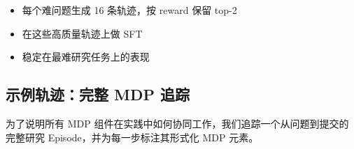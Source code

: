 \begin{enumerate}
\begin{itemize}
  \item 每个难问题生成 16 条轨迹，按 reward 保留 top-2
  \item 在这些高质量轨迹上做 SFT
  \item 稳定在最难研究任务上的表现
\end{itemize}
\end{enumerate}

\subsection{示例轨迹：完整 MDP 追踪}
\label{example-trajectory-full-mdp-trace}

为了说明所有 MDP 组件在实践中如何协同工作，我们追踪一个从问题到提交的完整研究 Episode，并为每一步标注其形式化 MDP 元素。


